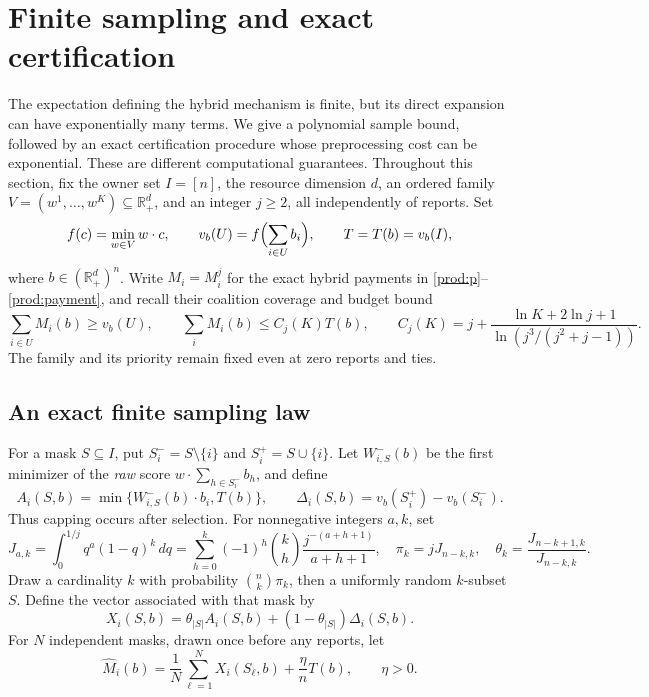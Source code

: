 \documentclass[11pt]{article}
\theoremstyle{definition}\newtheorem{definition}[theorem]{Definition}
\theoremstyle{remark}\newtheorem{remark}[theorem]{Remark}
\newcommand{\R}{\mathbb R}
\begin{document}
\section{Finite sampling and exact certification}\label{alg:section}
The expectation defining the hybrid mechanism is finite, but its direct
expansion can have exponentially many terms.  We give a polynomial sample
bound, followed by an exact certification procedure whose preprocessing cost
can be exponential.  These are different computational guarantees.
Throughout this section, fix the owner set $I=[n]$, the resource dimension $d$,
an ordered family $V=(w^1,\ldots,w^K)\subseteq\R_+^d$, and an integer $j\ge2$,
all independently of reports.  Set
\[
 f(c)=\min_{w\in V}w\cdot c,\qquad
 v_b(U)=f\Bigl(\sum_{i\in U}b_i\Bigr),\qquad T=T(b)=v_b(I),
\]
where $b\in(\R_+^d)^n$. Write $M_i=M_i^j$ for the exact hybrid payments
in \eqref{prod:p}--\eqref{prod:payment}, and recall their coalition coverage and budget bound
\begin{equation}\label{alg:exact-budget}
 \sum_{i\in U}M_i(b)\ge v_b(U),\qquad
 \sum_iM_i(b)\le C_j(K)T(b),\qquad
 C_j(K)=j+\frac{\ln K+2\ln j+1}{\ln(j^3/(j^2+j-1))}.
\end{equation}
The family and its priority remain fixed even at zero reports and ties.

\subsection{An exact finite sampling law}
For a mask $S\subseteq I$, put $S_i^-=S\setminus\{i\}$ and
$S_i^+=S\cup\{i\}$.  Let $W^-_{i,S}(b)$ be the first minimizer of the
\emph{raw} score $w\cdot\sum_{h\in S_i^-}b_h$, and define
\begin{equation}\label{alg:sample-components}
 A_i(S,b)=\min\{W^-_{i,S}(b)\cdot b_i,T(b)\},\qquad
 \Delta_i(S,b)=v_b(S_i^+)-v_b(S_i^-).
\end{equation}
Thus capping occurs after selection.  For nonnegative integers $a,k$, set
\begin{equation}\label{alg:integrals}
 J_{a,k}=\int_0^{1/j}q^a(1-q)^k\,dq
 =\sum_{h=0}^k(-1)^h\binom kh\frac{j^{-(a+h+1)}}{a+h+1},
 \quad \pi_k=jJ_{n-k,k},\quad
 \theta_k=\frac{J_{n-k+1,k}}{J_{n-k,k}}.
\end{equation}
Draw a cardinality $k$ with probability $\binom nk\pi_k$, then a uniformly
random $k$-subset $S$.  Define the vector associated with that mask by
\begin{equation}\label{alg:finite-sample}
 X_i(S,b)=\theta_{|S|}A_i(S,b)+(1-\theta_{|S|})\Delta_i(S,b).
\end{equation}
For $N$ independent masks, drawn once before any reports, let
\begin{equation}\label{alg:sample-payment}
 \widehat M_i(b)=\frac1N\sum_{\ell=1}^N X_i(S_\ell,b)
                       +\frac{\eta}{n}T(b),\qquad \eta>0.
\end{equation}
\end{document}
